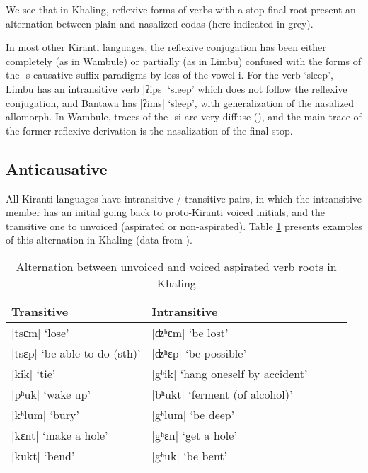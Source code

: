 \documentclass[oneside,a4paper,11pt]{article}
\newcommand{\ipa}[1]{{\phon\mbox{#1}}} %
\newcommand{\dhatu}[2]{|\ipa{#1}| `#2'}
\begin{document}
We see that in Khaling, reflexive forms of verbs with a stop final root present an alternation between plain and nasalized codas (here indicated in grey). 

In most other Kiranti languages, the reflexive conjugation has been either completely (as in Wambule) or partially (as in Limbu) confused with the forms of the \ipa{-s} causative suffix paradigms by loss of the vowel \ipa{i}. For the verb `sleep', Limbu has an intransitive verb \dhatu{ʔips}{sleep} which does not follow the reflexive conjugation, and Bantawa has \dhatu{ʔims}{sleep}, with generalization of the nasalized allomorph. In Wambule, traces of the \ipa{-si} are very diffuse (\citealt[305]{opgenort04wambule}), and the main trace of the former reflexive derivation is the nasalization of the final stop.
 

\subsection{Anticausative} \label{sec:anticaus}
All Kiranti languages have intransitive / transitive pairs, in which the intransitive member has an initial going back to proto-Kiranti voiced initials, and the transitive one to unvoiced (aspirated or non-aspirated). Table \ref{tab:anticaus} presents examples of this alternation in Khaling (data from \citealt{jacques15derivational.khaling}).

\begin{table}[H]
\caption{Alternation between unvoiced and voiced aspirated verb roots in Khaling} \centering \label{tab:anticaus}
\begin{tabular}{lllll}
\toprule
Transitive & Intransitive&  \\
\midrule
\dhatu{tsɛm}{lose} & \dhatu{ʣʰɛm}{be lost} \\
\dhatu{tsɛp}{be able to do (sth)} & \dhatu{ʣʰɛp}{be possible} \\
\dhatu{kik}{tie} & \dhatu{gʰik}{hang oneself by accident} \\
\dhatu{pʰuk}{wake up} & \dhatu{bʰukt}{ferment (of alcohol)} \\
\dhatu{kʰlum}{bury} & \dhatu{gʰlum}{be deep} \\
\midrule
\dhatu{kɛnt}{make a hole} & \dhatu{gʰɛn}{get a hole} \\
\dhatu{kukt}{bend} & \dhatu{gʰuk}{be bent}\\
\bottomrule
\end{tabular}
\end{table}
\end{document}
